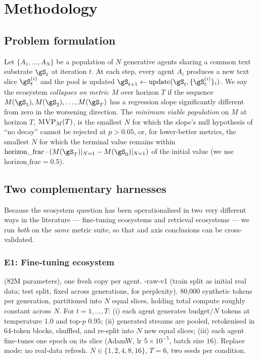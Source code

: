\section{Methodology}
\label{sec:methodology}

\subsection{Problem formulation}
\label{sec:problem}

Let $\{A_1, \ldots, A_N\}$ be a population of $N$ generative agents
sharing a common text substrate $\gS_t$ at iteration $t$. At each step,
every agent $A_i$ produces a new text slice $\gS_t^{(i)}$ and the pool
is updated $\gS_{t+1} \leftarrow \mathrm{update}(\gS_t,
\{\gS_t^{(i)}\}_i)$. We say the ecosystem \emph{collapses on
metric $M$} over horizon $T$ if the sequence $M(\gS_1), M(\gS_2),
\ldots, M(\gS_T)$ has a regression slope significantly different from
zero in the worsening direction. The \emph{minimum viable population}
on $M$ at horizon $T$, $\textsc{MVP}_M(T)$, is the smallest $N$ for which the
slope's null hypothesis of ``no decay'' cannot be rejected at
$p > 0.05$, or, for lower-better metrics, the smallest $N$ for which
the terminal value remains within
$\mathrm{horizon\_frac} \cdot (M(\gS_T)|_{N=1} - M(\gS_0)|_{N=1})$
of the initial value (we use $\mathrm{horizon\_frac} = 0.5$).

\subsection{Two complementary harnesses}
\label{sec:harnesses}

Because the ecosystem question has been operationalised in two very
different ways in the literature --- fine-tuning ecosystems
\citep{hodel2026epistemic, shumailov2024nature} and retrieval ecosystems
\citep{wang2025web} --- we run \emph{both} on the \emph{same} metric
suite, so that \mvp and axis conclusions can be cross-validated.

\subsubsection{E1: Fine-tuning ecosystem}
\label{sec:e1}

 \distilgpt (82M parameters), one fresh copy per agent.
 \wikitext-raw-v1 (train split as initial real data; test
split, fixed across generations, for perplexity).
 80{,}000 synthetic tokens per
generation, partitioned into $N$ equal slices, holding total compute
roughly constant across $N$.
 For $t = 1, \ldots, T$:
(i) each agent generates $\mathrm{budget}/N$ tokens at temperature
$1.0$ and top-$p$ $0.95$; (ii) generated streams are pooled,
retokenised in 64-token blocks, shuffled, and re-split into $N$ new
equal slices; (iii) each agent fine-tunes one epoch on its slice
(AdamW, lr $5{\times}10^{-5}$, batch size $16$). Replace mode: no
real-data refresh.
 $N \in \{1, 2, 4, 8, 16\}$, $T = 6$, two seeds per
condition.

